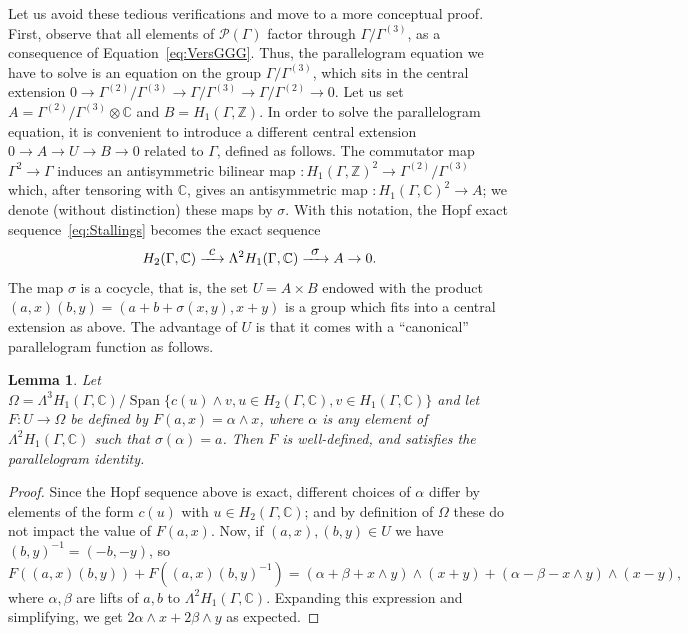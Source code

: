 \documentclass[11pt]{article}
\let\mathcal\mathscr
\def\To#1{\mathchoice{\xrightarrow{\textstyle\kern4pt#1\kern3pt}}{\stackrel{#1}{\longrightarrow}}{}{}}
\newtheorem{lemma}[theorem]{Lemma}
\theoremstyle{definition}
\newcommand{\ZZ}{\mathbb{Z}}
\newcommand{\CC}{\mathbb{C}}
\begin{document}
Let us avoid these tedious verifications and move to a more conceptual proof.
First, observe that all elements of $\mathcal{P}(\Gamma)$ factor through
$\Gamma/\Gamma^{(3)}$, as a consequence of Equation~\eqref{eq:VersGGG}.
Thus, the parallelogram equation we have to solve is an equation on the
group $\Gamma/\Gamma^{(3)}$, which sits in the central extension
$0\to\Gamma^{(2)}/\Gamma^{(3)}\to\Gamma/\Gamma^{(3)}
\to\Gamma/\Gamma^{(2)}\to 0$.
Let us set $A=\Gamma^{(2)}/\Gamma^{(3)}\otimes\CC$ and $B=H_1(\Gamma,\ZZ)$.
In order to solve the parallelogram equation, it is convenient to introduce
a different central extension $0\to A\to U\to B\to 0$ related to $\Gamma$,
defined as follows. The commutator map $\Gamma^2\to \Gamma$ induces an
antisymmetric bilinear map
$\colon H_1(\Gamma,\ZZ)^2\to \Gamma^{(2)}/\Gamma^{(3)}$
which, after tensoring with $\CC$, gives an antisymmetric map
$\colon H_1(\Gamma,\CC)^2\to A$; we denote (without distinction) these maps
by $\sigma$. With this notation, the Hopf exact
sequence~\eqref{eq:Stallings} becomes the exact sequence
\[
H_2(\Gamma,\CC)\To{c}\Lambda^2H_1(\Gamma,\CC) \To{\sigma} A\to 0.
\]
The map $\sigma$ is a cocycle, that is, the set $U=A\times B$ endowed with
the product $(a,x)(b,y)=(a+b+\sigma(x,y),x+y)$ is a group which fits into
a central extension as above. The advantage of $U$ is that it comes with a
``canonical'' parallelogram function as follows.
\begin{lemma}
Let $\Omega=\Lambda^3 H_1(\Gamma,\CC)/\operatorname{Span}\lbrace
c(u)\wedge v, u\in H_2(\Gamma,\CC),v\in H_1(\Gamma,\CC)\rbrace$
and let $F\colon U\to \Omega$ be defined by $F(a,x)=\alpha\wedge x$,
where $\alpha$ is any element of $\Lambda^2H_1(\Gamma,\CC)$ such that
$\sigma(\alpha)=a$.
Then $F$ is well-defined, and satisfies the parallelogram identity.
\end{lemma}

\begin{proof}
Since the Hopf sequence above is exact, different choices of $\alpha$
differ by elements of the form $c(u)$ with $u\in H_2(\Gamma,\CC)$;
and by definition of $\Omega$ these do not impact the value of $F(a,x)$.
Now, if $(a,x),(b,y)\in U$ we have $(b,y)^{-1}=(-b,-y)$, so
\[F((a,x)(b,y))+F((a,x)(b,y)^{-1})=(\alpha+\beta+x\wedge y)\wedge(x+y) +
(\alpha-\beta-x\wedge y)\wedge (x-y), \]
where $\alpha,\beta$ are lifts of $a,b$ to $\Lambda^2H_1(\Gamma,\CC)$.
Expanding this expression and simplifying, we get
$2\alpha\wedge x+2\beta\wedge y$ as expected.
\end{proof}
\end{document}
